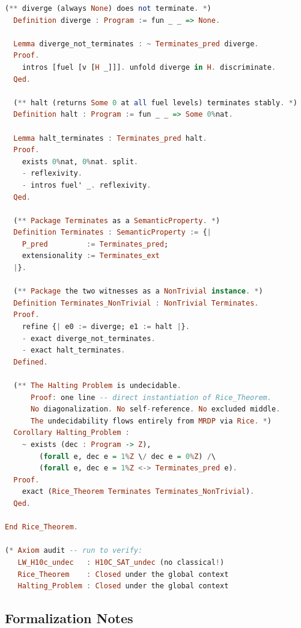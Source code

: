 \documentclass{lmcs}
\begin{document}
\begin{lstlisting}[language=Haskell, caption=Complete Rocq Formalization, label=lst:rocq, basicstyle=\ttfamily\tiny]
  (** diverge (always None) does not terminate. *)
  Definition diverge : Program := fun _ _ => None.

  Lemma diverge_not_terminates : ~ Terminates_pred diverge.
  Proof.
    intros [fuel [v [H _]]]. unfold diverge in H. discriminate.
  Qed.

  (** halt (returns Some 0 at all fuel levels) terminates stably. *)
  Definition halt : Program := fun _ _ => Some 0%nat.

  Lemma halt_terminates : Terminates_pred halt.
  Proof.
    exists 0%nat, 0%nat. split.
    - reflexivity.
    - intros fuel' _. reflexivity.
  Qed.

  (** Package Terminates as a SemanticProperty. *)
  Definition Terminates : SemanticProperty := {|
    P_pred         := Terminates_pred;
    extensionality := Terminates_ext
  |}.

  (** Package the two witnesses as a NonTrivial instance. *)
  Definition Terminates_NonTrivial : NonTrivial Terminates.
  Proof.
    refine {| e0 := diverge; e1 := halt |}.
    - exact diverge_not_terminates.
    - exact halt_terminates.
  Defined.

  (** The Halting Problem is undecidable.
      Proof: one line -- direct instantiation of Rice_Theorem.
      No diagonalization. No self-reference. No excluded middle.
      The undecidability flows entirely from MRDP via Rice. *)
  Corollary Halting_Problem :
    ~ exists (dec : Program -> Z),
        (forall e, dec e = 1%Z \/ dec e = 0%Z) /\
        (forall e, dec e = 1%Z <-> Terminates_pred e).
  Proof.
    exact (Rice_Theorem Terminates Terminates_NonTrivial).
  Qed.

End Rice_Theorem.

(* Axiom audit -- run to verify:
   LW_H10c_undec   : H10C_SAT_undec (no classical!)
   Rice_Theorem    : Closed under the global context
   Halting_Problem : Closed under the global context
\end{lstlisting}

\subsection{Formalization Notes}
\end{document}
